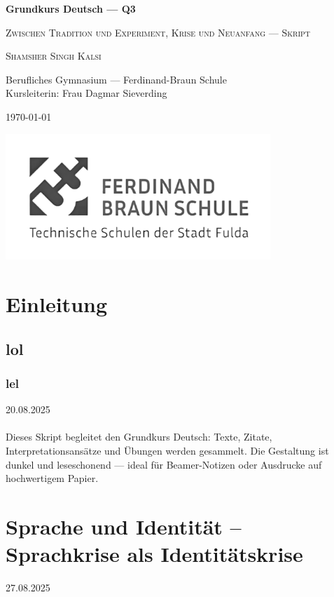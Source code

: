 \documentclass[11pt,a4paper,oneside]{article}
\newcommand{\lessondate}[1]{\noindent\hfill\textcolor{MarginalGray}{\textsc{#1}}\\\vspace{0.5cm}}
\newcommand{\MakeArtTitle}[4]{%
	\begin{titlepage}
		\centering
		\vspace*{24mm}
		{\sffamily\bfseries\huge #1 \par}
		\vspace{8mm}
		{\Large \scshape#2 \par}
		\vspace{16mm}
		{\large\scshape #3 \par}
		\vspace{6mm}
		{\small\color{MarginalGray} #4 \par}
		\vspace{8mm}
		{\small\color{MarginalGray}\today \par}
		\vfill
		\vspace{6cm}
		\centering
		\includegraphics[width=0.75\textwidth]{image.png} %
	\end{titlepage}
}
\begin{document}
	
	\MakeArtTitle
	{Grundkurs Deutsch — Q3}
	{Zwischen Tradition und Experiment, Krise und Neuanfang — Skript}
	{Shamsher Singh Kalsi}
	{Berufliches Gymnasium — Ferdinand-Braun Schule \\ Kursleiterin: Frau Dagmar Sieverding}
	
	\tableofcontents
	\clearpage
	
	\section{Einleitung}
	\subsection{lol}
	\subsubsection{lel}
	\lessondate{20.08.2025}\\
	Dieses Skript begleitet den Grundkurs Deutsch: Texte, Zitate, Interpretationsansätze und Übungen werden gesammelt. Die Gestaltung ist dunkel und leseschonend — ideal für Beamer-Notizen oder Ausdrucke auf hochwertigem Papier.
	
	
	\newpage
	
	\section{Sprache und Identität – Sprachkrise als Identitätskrise}
	\lessondate{27.08.2025}\\
	
\end{document}
